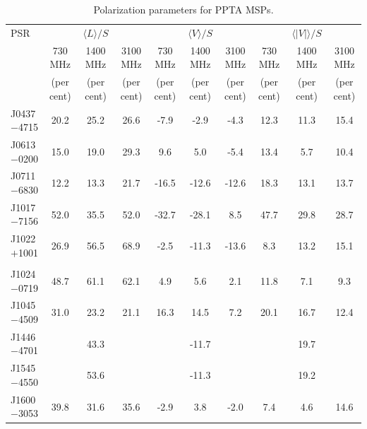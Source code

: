 \documentclass[useAMS,usenatbib]{mn2e}
\begin{document}
\begin{table}
\begin{center}
\caption{Polarization parameters for PPTA MSPs.}
\label{tablePol}
\begin{tabular}{lccccccccc}
\hline
PSR              &                  &    $\langle L \rangle/S$    &                  &               & $\langle V \rangle/S$       &                  &      &      $\langle|V|\rangle/S$       &                      \\
								 &     730 MHz      &          1400 MHz           &    3100 MHz      &  730 MHz      &          1400 MHz           &    3100 MHz      &  730 MHz      &          1400 MHz           &    3100 MHz       \\
								 &     (per cent)   &         (per cent)          &     (per cent)   &    (per cent)   &         (per cent)          &     (per cent)   &   (per cent)   &         (per cent)          &     (per cent)  \\
\hline
J0437$-$4715     &  20.2 &  25.2 &  26.6 &  -7.9 & -2.9 & -4.3 & 12.3 &  11.3 &  15.4  \\
J0613$-$0200     &  15.0 &  19.0 &  29.3 &  9.6  & 5.0  & -5.4 & 13.4 &  5.7  &  10.4  \\
J0711$-$6830     &  12.2 &  13.3 &  21.7 &  -16.5& -12.6& -12.6& 18.3 &  13.1 &  13.7  \\
J1017$-$7156     &  52.0 &  35.5 &  52.0 &  -32.7& -28.1& 8.5  & 47.7 &  29.8 &  28.7  \\
J1022$+$1001     &  26.9 &  56.5 &  68.9 &  -2.5 & -11.3& -13.6& 8.3  &  13.2 &  15.1  \\
       &      &   &   &   &   &   &   &                                              \\
J1024$-$0719     &  48.7 &  61.1 &  62.1 &  4.9  & 5.6  & 2.1  & 11.8 &  7.1  &  9.3   \\
J1045$-$4509     &  31.0 &  23.2 &  21.1 &  16.3 & 14.5 & 7.2  & 20.1 &  16.7 &  12.4  \\
J1446$-$4701     &   &  43.3 &   &   & -11.7& & &  19.7 &    \\
J1545$-$4550     &   &  53.6 &   &   & -11.3& & &  19.2 &    \\
J1600$-$3053     &  39.8 &  31.6 &  35.6 &  -2.9 & 3.8  & -2.0 & 7.4  &  4.6  &  14.6  \\

\end{tabular}
\end{center}
\end{table}
\end{document}
